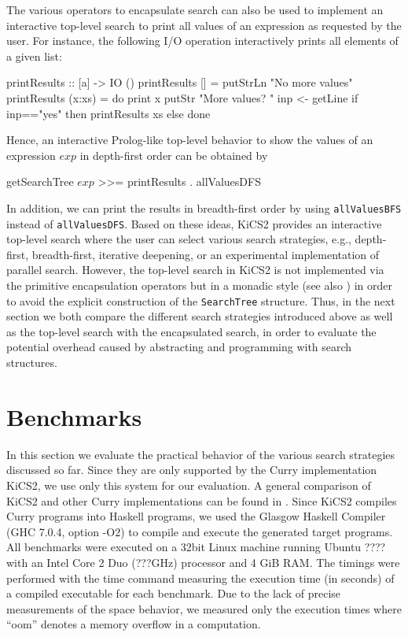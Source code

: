 \documentclass[english]{lni}
\newcommand{\code}[1]{\texttt{\small{}#1}}
\begin{document}
The various operators to encapsulate search can also
be used to implement an interactive top-level search
to print all values of an expression as requested by the user.
For instance, the following I/O operation interactively 
prints all elements of a given list:
%
\begin{curry}
printResults :: [a] -> IO ()
printResults []     = putStrLn "No more values"
printResults (x:xs) = do print x
                         putStr "More values? "
                         inp <- getLine
                         if inp=="yes" then printResults xs
                                       else done
\end{curry}
%
Hence, an interactive Prolog-like top-level behavior
to show the values of an expression $exp$ in depth-first order
can be obtained by
\begin{curry}
getSearchTree $exp$ >>= printResults . allValuesDFS
\end{curry}
In addition, we can print the results in breadth-first order
by using \code{allValuesBFS} instead of \code{allValuesDFS}.
Based on these ideas, KiCS2 provides an interactive top-level search
where the user can select various search strategies,
e.g., depth-first, breadth-first, iterative deepening, or
an experimental implementation of parallel search.
However, the top-level search in KiCS2 is not implemented
via the primitive encapsulation operators but in
a monadic style (see also \cite{BrasselHanusPeemoellerReck11})
in order to avoid the explicit construction
of the \code{SearchTree} structure.
Thus, in the next section we both compare the different search strategies
introduced above as well as the top-level search
with the encapsulated search, in order to evaluate the potential overhead
caused by abstracting and programming with search structures.


\section{Benchmarks}
\label{sec:benchmarks}

In this section we evaluate the practical behavior
of the various search strategies discussed so far.
Since they are only supported by the Curry implementation KiCS2,
we use only this system for our evaluation.
A general comparison of KiCS2 and other Curry implementations
can be found in \cite{BrasselHanusPeemoellerReck11}.
Since KiCS2 compiles Curry programs into Haskell programs,
we used the Glasgow Haskell Compiler
(GHC 7.0.4, option -O2) to compile and execute
the generated target programs.
All benchmarks were executed on a 32bit Linux machine
running Ubuntu ???? with an Intel Core 2 Duo (???GHz) processor and 4 GiB RAM.
The timings were performed with the time command measuring the
execution time (in seconds) of a compiled executable for each benchmark.
Due to the lack of precise measurements of the space behavior,
we measured only the execution times where
``oom'' denotes a memory overflow in a computation.
\end{document}
